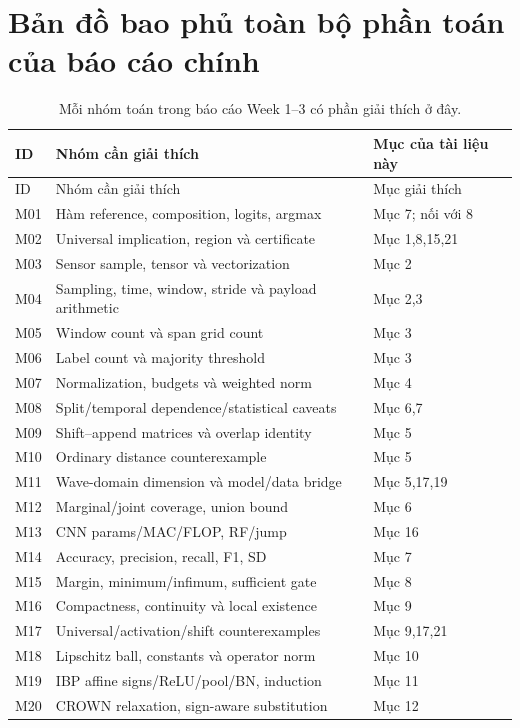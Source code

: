 \documentclass[11pt,a4paper]{article}
\theoremstyle{definition}
\begin{document}
\section{Bản đồ bao phủ toàn bộ phần toán của báo cáo chính}
\begin{longtable}{@{}p{0.85cm}p{6.5cm}p{6.2cm}@{}}
\caption{Mỗi nhóm toán trong báo cáo Week 1--3 có phần giải thích ở đây.}\\
\toprule ID & Nhóm cần giải thích & Mục của tài liệu này\\\midrule\endfirsthead
\toprule ID & Nhóm cần giải thích & Mục giải thích\\\midrule\endhead
M01 & Hàm reference, composition, logits, argmax & Mục 7; nối với 8\\
M02 & Universal implication, region và certificate & Mục 1,8,15,21\\
M03 & Sensor sample, tensor và vectorization & Mục 2\\
M04 & Sampling, time, window, stride và payload arithmetic & Mục 2,3\\
M05 & Window count và span grid count & Mục 3\\
M06 & Label count và majority threshold & Mục 3\\
M07 & Normalization, budgets và weighted norm & Mục 4\\
M08 & Split/temporal dependence/statistical caveats & Mục 6,7\\
M09 & Shift--append matrices và overlap identity & Mục 5\\
M10 & Ordinary distance counterexample & Mục 5\\
M11 & Wave-domain dimension và model/data bridge & Mục 5,17,19\\
M12 & Marginal/joint coverage, union bound & Mục 6\\
M13 & CNN params/MAC/FLOP, RF/jump & Mục 16\\
M14 & Accuracy, precision, recall, F1, SD & Mục 7\\
M15 & Margin, minimum/infimum, sufficient gate & Mục 8\\
M16 & Compactness, continuity và local existence & Mục 9\\
M17 & Universal/activation/shift counterexamples & Mục 9,17,21\\
M18 & Lipschitz ball, constants và operator norm & Mục 10\\
M19 & IBP affine signs/ReLU/pool/BN, induction & Mục 11\\
M20 & CROWN relaxation, sign-aware substitution & Mục 12\\

\end{longtable}
\end{document}
